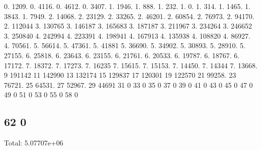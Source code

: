 0. 1209. 0. 4116. 0. 4612. 0. 3407. 1. 1946. 1. 888. 1. 232. 1. 0. 1. 314. 1. 1465. 1. 3843. 1. 7949. 2. 14068. 2. 23129. 2. 33265. 2. 46201. 2. 60854. 2. 76973. 2. 94170. 2. 112044 3. 130765 3. 146187 3. 165683 3. 187187 3. 211967 3. 234264 3. 246652 3. 250840 4. 242994 4. 223391 4. 198941 4. 167913 4. 135938 4. 108820 4. 86927. 4. 70561. 5. 56614. 5. 47361. 5. 41881 5. 36690. 5. 34902. 5. 30893. 5. 28910. 5. 27155. 6. 25818. 6. 23643. 6. 23155. 6. 21761. 6. 20533. 6. 19787. 6. 18767. 6. 17172. 7. 18372. 7. 17273. 7. 16235 7. 15615. 7. 15153. 7. 14450. 7. 14344 7. 13668. 9 191142 11 142990 13 132174 15 129837 17 120301 19 122570 21 99258. 23 76721. 25 64531. 27 52967. 29 44691 31 0 33 0 35 0 37 0 39 0 41 0 43 0 45 0 47 0 49 0 51 0 53 0 55 0 58 0 \subsection*{62 0 }

Total\+: 5.\+07707e+06 